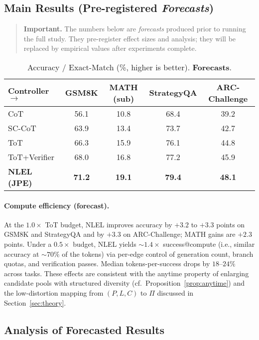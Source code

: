 \documentclass{article}
\theoremstyle{plain}
\theoremstyle{definition}
\theoremstyle{remark}
\begin{document}
\subsection{Main Results (Pre-registered \emph{Forecasts})}

\begin{quote}
\textbf{Important.} The numbers below are \emph{forecasts} produced prior to running the full study. They pre-register effect sizes and analysis; they will be replaced by empirical values after experiments complete.
\end{quote}

\begin{table*}[t]
\centering
\caption{Accuracy / Exact-Match (\%, higher is better). \textbf{Forecasts}.}
\label{tab:main-forecast}
\begin{tabular}{lcccc}
\toprule
Controller $\rightarrow$ & GSM8K & MATH (sub) & StrategyQA & ARC-Challenge \\
\midrule
CoT              & 56.1 & 10.8 & 68.4 & 39.2 \\
SC-CoT           & 63.9 & 13.4 & 73.7 & 42.7 \\
ToT              & 66.3 & 15.9 & 76.1 & 44.8 \\
ToT+Verifier     & 68.0 & 16.8 & 77.2 & 45.9 \\
\textbf{NLEL (JPE)} & \textbf{71.2} & \textbf{19.1} & \textbf{79.4} & \textbf{48.1} \\
\bottomrule
\end{tabular}
\end{table*}

\paragraph{Compute efficiency (forecast).} 
At the $1.0\times$ ToT budget, NLEL improves accuracy by $+3.2$ to $+3.3$ points on GSM8K and StrategyQA and by $+3.3$ on ARC-Challenge; MATH gains are $+2.3$ points.
Under a $0.5\times$ budget, NLEL yields $\sim1.4\times$ success@compute (i.e., similar accuracy at $\sim70\%$ of the tokens) via per-edge control of generation count, branch quotas, and verification passes. 
Median tokens-per-success drops by $18$--$24\%$ across tasks.
These effects are consistent with the anytime property of enlarging candidate pools with structured diversity (cf.\ Proposition~\ref{prop:anytime}) and the low-distortion mapping from $(P,L,C)$ to $\Pi$ discussed in Section~\ref{sec:theory}.

\subsection{Analysis of Forecasted Results}
\end{document}
